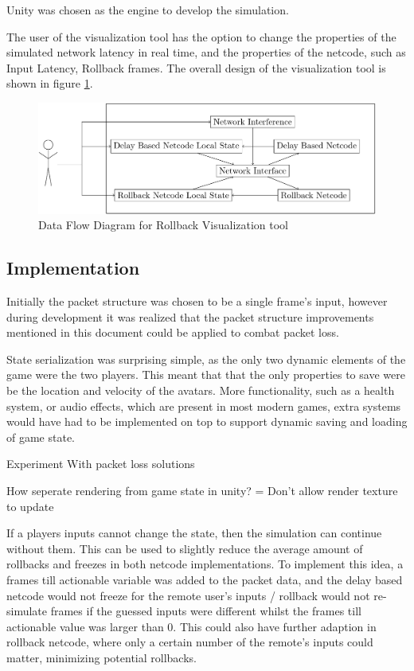 \documentclass{entcs}
\begin{document}
Unity was chosen as the engine to develop the simulation.

The user of the visualization tool has the option to change the properties of the simulated network latency in real time, and the properties of the netcode, such as Input Latency, Rollback frames. 
The overall design of the visualization tool is shown in figure \ref{fig:DFD}.

\begin{figure}[h]
\centering
\includegraphics[width=\textwidth]{UIDesign}
\caption{Data Flow Diagram for Rollback Visualization tool}
\label{fig:DFD}
\end{figure}

\subsection{Implementation}

Initially the packet structure was chosen to be a single frame's input, however during development it was realized that the packet structure improvements mentioned in this document could be applied to combat packet loss.

State serialization was surprising simple, as the only two dynamic elements of the game were the two players. This meant that that the only properties to save were be the location and velocity of the avatars. More functionality, such as a health system, or audio effects, which are present in most modern games, extra systems would have had to be implemented on top to support dynamic saving and loading of game state.

Experiment With packet loss solutions


How seperate rendering from game state in unity? = Don't allow render texture to update


If a players inputs cannot change the state, then the simulation can continue without them. This can be used to slightly reduce the average amount of rollbacks and freezes in both netcode implementations. To implement this idea, a frames till actionable variable was added to the packet data, and the delay based netcode would not freeze for the remote user's inputs / rollback would not re-simulate frames if the guessed inputs were different whilst the frames till actionable value was larger than 0. This could also have further adaption in rollback netcode, where only a certain number of the remote's inputs could matter, minimizing potential rollbacks.
\end{document}
